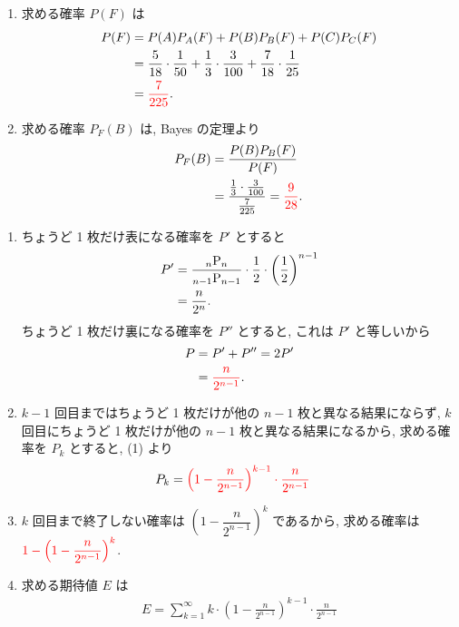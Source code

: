 \begin{qenumerate}
{\begin{enumerate}
			\item{
				求める確率 $P(F)$ は
				\begin{align}
					P(F) &= P(A)P_{A}(F) + P(B)P_{B}(F) + P(C)P_{C}(F) \\
						&= \frac{5}{18}\cdot\frac{1}{50} + \frac{1}{3}\cdot\frac{3}{100} + \frac{7}{18}\cdot\frac{1}{25} \\
						&= \textcolor{red}{\frac{7}{225}}.
				\end{align}
			}
			\item{
				求める確率 $P_{F}(B)$ は, Bayes の定理より
				\begin{align}
					P_{F}(B) &= \frac{P(B)P_{B}(F)}{P(F)} \\
						&= \frac{\frac{1}{3}\cdot\frac{3}{100}}{\frac{7}{225}} = \textcolor{red}{\frac{9}{28}}.
				\end{align}
			}
		\end{enumerate}
	}
	\item{
		\begin{enumerate}
			\item{
				ちょうど 1 枚だけ表になる確率を $P'$ とすると
				\begin{align}
					P' &= \frac{{{}_{n}\mathrm{P}_{n}}}{{{}_{n - 1}\mathrm{P}_{n - 1}}}\cdot\frac{1}{2}\cdot\left(\frac{1}{2}\right)^{n - 1} \\
						&= \frac{n}{2^{n}}.
				\end{align}
				ちょうど 1 枚だけ裏になる確率を $P''$ とすると, これは $P'$ と等しいから
				\begin{align}
					P &= P' + P'' = 2P' \\
						&= \textcolor{red}{\frac{n}{2^{n - 1}}}.
				\end{align}
			}
			\item{
				$k - 1$ 回目まではちょうど 1 枚だけが他の $n - 1$ 枚と異なる結果にならず, $k$ 回目にちょうど 1 枚だけが他の $n - 1$ 枚と異なる結果になるから, 求める確率を $P_{k}$ とすると, (1) より
				\begin{align}
					P_{k} &= \textcolor{red}{\left(1 - \frac{n}{2^{n - 1}}\right)^{k - 1}\cdot\frac{n}{2^{n - 1}}}
				\end{align}
			}
			\item{
				$k$ 回目まで終了しない確率は $\left(1 - \dfrac{n}{2^{n - 1}}\right)^{k}$ であるから, 求める確率は $\textcolor{red}{1 - \left(1 - \dfrac{n}{2^{n - 1}}\right)^{k}}$.
			}
			\item{
				求める期待値 $E$ は
				\begin{align}
					E = \sum_{k = 1}^{\infty}{k\cdot\left(1 - \frac{n}{2^{n - 1}}\right)^{k - 1}\cdot\frac{n}{2^{n - 1}}}

\end{align}}
\end{enumerate}}
\end{qenumerate}
